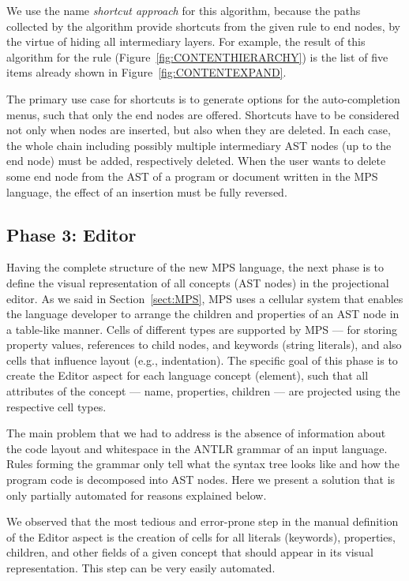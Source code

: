 We use the name \emph{shortcut approach} for this algorithm, because the paths collected by the algorithm provide shortcuts from the given rule to end nodes, by the virtue of hiding all intermediary layers.
For example, the result of this algorithm for the  rule (Figure~\ref{fig:CONTENTHIERARCHY}) is the list of five items already shown in Figure~\ref{fig:CONTENTEXPAND}.

The primary use case for shortcuts is to generate options for the auto-completion menus, such that only the end nodes are offered.
Shortcuts have to be considered not only when nodes are inserted, but also when they are deleted.
In each case, the whole chain including possibly multiple intermediary AST nodes (up to the end node) must be added, respectively deleted.
When the user wants to delete some end node from the AST of a program or document written in the MPS language, the effect of an insertion must be fully reversed.

\subsection{Phase 3: Editor}
\label{sect:EDITORDEF}

Having the complete structure of the new MPS language, the next phase is to define the visual representation of all concepts (AST nodes) in the projectional editor.
As we said in Section~\ref{sect:MPS}, MPS uses a cellular system that enables the language developer to arrange the children and properties of an AST node in a table-like manner.
Cells of different types are supported by MPS --- for storing property values, references to child nodes, and keywords (string literals), and also cells that influence layout (e.g., indentation).
The specific goal of this phase is to create the Editor aspect for each language concept (element), such that all attributes of the concept --- name, properties, children --- are projected using the respective cell types.

The main problem that we had to address is the absence of information about the code layout and whitespace in the ANTLR grammar of an input language.
Rules forming the grammar only tell what the syntax tree looks like and how the program code is decomposed into AST nodes.
Here we present a solution that is only partially automated for reasons explained below.

We observed that the most tedious and error-prone step in the manual definition of the Editor aspect is the creation of cells for all literals (keywords), properties, children, and other fields of a given concept that should appear in its visual representation.
This step can be very easily automated.


